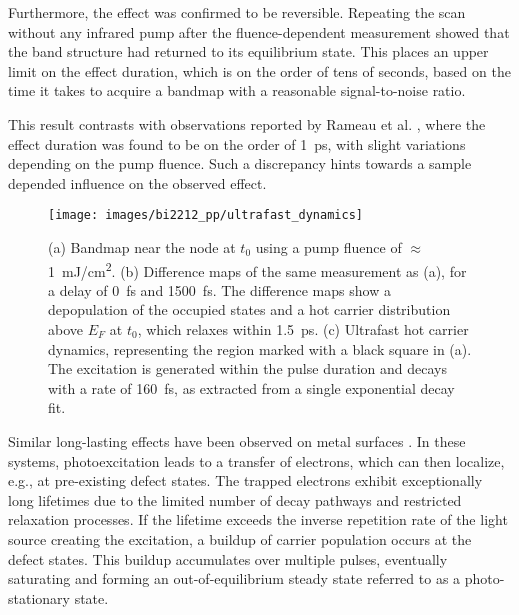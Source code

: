 Furthermore, the effect was confirmed to be reversible.
Repeating the scan without any infrared pump after the fluence-dependent measurement showed that the band structure had returned to its equilibrium state.
This places an upper limit on the effect duration, which is on the order of tens of seconds, based on the time it takes to acquire a bandmap with a reasonable signal-to-noise ratio.

This result contrasts with observations reported by Rameau et al. \cite{rameau_photoinduced_2014}, where the effect duration was found to be on the order of \qty{1}{\pico\second}, with slight variations depending on the pump fluence.
Such a discrepancy hints towards a sample depended influence on the observed effect.

\begin{figure}[b!]
	\centering
	\texttt{[image: images/bi2212\_pp/ultrafast\_dynamics]}
	\caption{(a) Bandmap near the node at $t_0$ using a pump fluence of $\approx$\qty{1}{\milli\joule/\centi\meter\squared}. (b) Difference maps of the same measurement as (a), for a delay of \qty{0}{\femto\second} and \qty{1500}{\femto\second}. The difference maps show a depopulation of the occupied states and a hot carrier distribution above $E_F$ at $t_0$, which relaxes within \qty{1.5}{\pico\second}. (c) Ultrafast hot carrier dynamics, representing the region marked with a black square in (a). The excitation is generated within the pulse duration and decays with a rate of \qty{160}{\femto\second}, as extracted from a single exponential decay fit.}
	\label{fig:ultrafast_dyn}
\end{figure}

Similar long-lasting effects have been observed on metal surfaces \cite{bovensiepen_dynamic_2009, gierster_ultrafast_2021, aeschlimann_time-resolved_2025}.
In these systems, photoexcitation leads to a transfer of electrons, which can then localize, e.g., at pre-existing defect states.
The trapped electrons exhibit exceptionally long lifetimes due to the limited number of decay pathways and restricted relaxation processes.
If the lifetime exceeds the inverse repetition rate of the light source creating the excitation, a buildup of carrier population occurs at the defect states.
This buildup accumulates over multiple pulses, eventually saturating and forming an out-of-equilibrium steady state referred to as a photo-stationary state.

